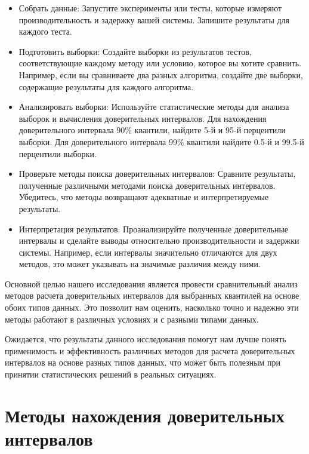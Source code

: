 \documentclass[specialist,
               substylefile = spbu_report.rtx,
               subf,href,colorlinks=true, 12pt]{disser}
\begin{document}
\begin{itemize}
 
\item  Собрать данные: Запустите эксперименты или тесты, которые измеряют производительность и задержку вашей системы. Запишите результаты для каждого теста.

\item Подготовить выборки: Создайте выборки из результатов тестов, соответствующие каждому методу или условию, которое вы хотите сравнить. Например, если вы сравниваете два разных алгоритма, создайте две выборки, содержащие результаты для каждого алгоритма.

\item Анализировать выборки: Используйте статистические методы для анализа выборок и вычисления доверительных интервалов. Для нахождения доверительного интервала 90\% квантили, найдите 5-й и 95-й перцентили выборки. Для доверительного интервала 99\% квантили найдите 0.5-й и 99.5-й перцентили выборки.

\item  Проверьте методы поиска доверительных интервалов: Сравните результаты, полученные различными методами поиска доверительных интервалов. Убедитесь, что методы возвращают адекватные и интерпретируемые результаты.

\item Интерпретация результатов: Проанализируйте полученные доверительные интервалы и сделайте выводы относительно производительности и задержки системы. Например, если интервалы значительно отличаются для двух методов, это может указывать на значимые различия между ними.
\end{itemize}

Основной целью нашего исследования является провести сравнительный анализ методов расчета доверительных интервалов для выбранных квантилей на основе обоих типов данных. Это позволит нам оценить, насколько точно и надежно эти методы работают в различных условиях и с разными типами данных.

Ожидается, что результаты данного исследования помогут нам лучше понять применимость и эффективность различных методов для расчета доверительных интервалов на основе разных типов данных, что может быть полезным при принятии статистических решений в реальных ситуациях.
\newpage
\section{Методы нахождения доверительных интервалов}
\end{document}

